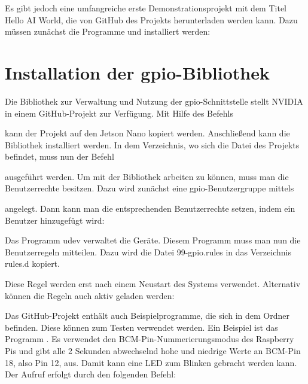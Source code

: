 Es gibt jedoch eine umfangreiche erste Demonstrationsprojekt mit dem Titel \glqq Hello AI World\grqq, die von GitHub des Projekts herunterladen werden kann. Dazu müssen zunächst die Programme  und  installiert werden:

\medskip








\section{Installation der \ac{gpio}-Bibliothek}

Die Bibliothek zur Verwaltung und Nutzung der \ac{gpio}-Schnittstelle stellt NVIDIA in einem GitHub-Projekt zur Verfügung. Mit Hilfe des Befehls 


\medskip
{}
\medskip

kann der Projekt auf den Jetson Nano kopiert werden. Anschließend kann die Bibliothek installiert werden. In dem Verzeichnis, wo sich die Datei  des Projekts befindet, muss nun der Befehl



\medskip
{}
\medskip

ausgeführt werden. Um mit der Bibliothek arbeiten zu können, muss man die Benutzerrechte besitzen. Dazu wird zunächst eine \ac{gpio}-Benutzergruppe mittels

\medskip
{} \newline
\medskip


angelegt. Dann kann man die entsprechenden Benutzerrechte setzen, indem ein Benutzer hinzugefügt wird:

\medskip
{}
\medskip

Das Programm udev verwaltet die Geräte. Diesem Programm muss man nun die Benutzerregeln mitteilen. Dazu wird die Datei 99-gpio.rules in das Verzeichnis rules.d kopiert.

\medskip
{}
\medskip

Diese Regel werden erst nach einem Neustart des Systems verwendet. Alternativ können die Regeln auch aktiv geladen werden:

\medskip
{}
\medskip

Das GitHub-Projekt enthält auch Beispielprogramme, die sich in dem Ordner  befinden. Diese können zum Testen verwendet werden.  Ein Beispiel ist das Programm . Es verwendet den BCM-Pin-Nummerierungsmodus des Raspberry Pis und gibt alle 2 Sekunden abwechselnd hohe und niedrige Werte an BCM-Pin 18, also Pin 12, aus. Damit kann eine LED zum Blinken gebracht werden kann. Der Aufruf erfolgt durch den folgenden Befehl:

\medskip
{}
\medskip

